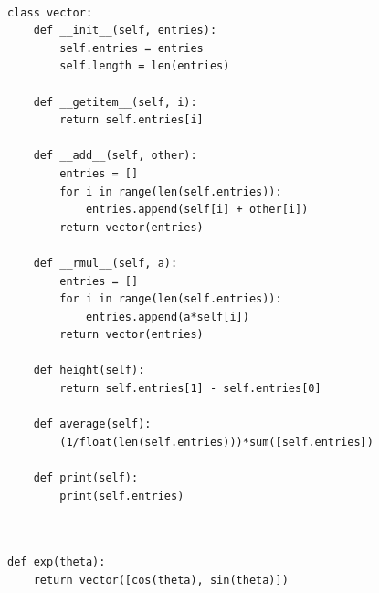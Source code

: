 \documentclass{book}
\newcounter{pcounter}
\begin{document}
\begin{center}
\begin{tcolorbox}[width=5in,colback={white},title={\begin{center}\texttt{Python \thepcounter} \addtocounter{pcounter}{1}  \end{center}},colbacktitle=Red,coltitle=black]
\begin{verbatim}

class vector:
    def __init__(self, entries):
        self.entries = entries
        self.length = len(entries)

    def __getitem__(self, i):
        return self.entries[i]

    def __add__(self, other):
        entries = []
        for i in range(len(self.entries)):
            entries.append(self[i] + other[i])
        return vector(entries)

    def __rmul__(self, a):
        entries = []
        for i in range(len(self.entries)):
            entries.append(a*self[i])
        return vector(entries)

    def height(self):
        return self.entries[1] - self.entries[0]

    def average(self):
        (1/float(len(self.entries)))*sum([self.entries])

    def print(self):
        print(self.entries)


\end{verbatim}%
\end{tcolorbox}
\end{center}

\begin{center}
\begin{tcolorbox}[width=5in,colback={white},title={\begin{center}\texttt{Python \thepcounter} \addtocounter{pcounter}{1}  \end{center}},colbacktitle=Red,coltitle=black]
\begin{verbatim}

def exp(theta):
    return vector([cos(theta), sin(theta)])

\end{verbatim}%
\end{tcolorbox}
\end{center}
\end{document}
